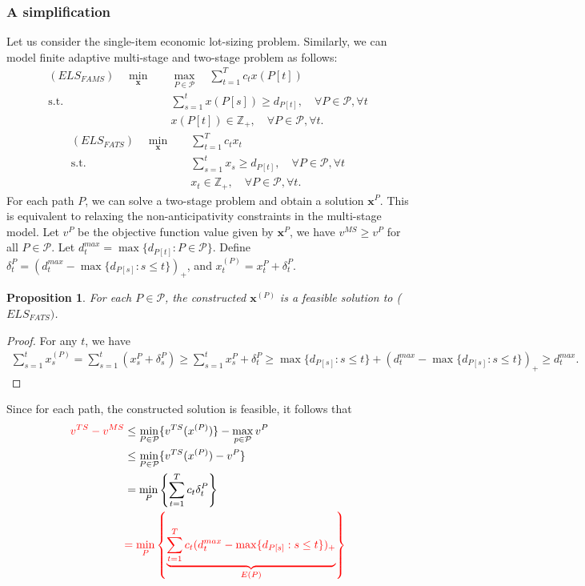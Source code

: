 \documentclass[10pt]{article}
\theoremstyle{plain}
\newtheorem{proposition}{Proposition}
\theoremstyle{definition}
\theoremstyle{remark}
\newcommand{\subjectto}{\text{s.t.}}
\newcommand{\bx}{\mathbf{x}}
\newcommand{\cP}{\mathcal{P}}
\newcommand{\Z}{\mathbb{Z}}
\begin{document}
\subsubsection*{A simplification}\label{simplification}
Let us consider the single-item economic lot-sizing problem.
Similarly, we can model finite adaptive multi-stage and two-stage problem as follows:
\begin{align}
(ELS_{FAMS}) \quad \min_{\bx} \quad
& \max_{P \in \cP} \quad  \sum_{t=1}^{T}c_t x(P[t])\\
\subjectto\quad 
& \sum_{s=1}^t x(P[s]) \ge d_{P[t]}, \quad \forall P\in \cP, \forall t \label{ELS:demand}\\
& x(P[t])\in \Z_+, \quad \forall P\in \cP, \forall t.
\end{align}
\begin{align*}
(ELS_{FATS}) \quad \min_{\bx} \quad 
&\sum_{t=1}^{T} c_t x_t\\
\subjectto\quad 
& \sum_{s=1}^t x_s \ge d_{P[t]}, \quad \forall P\in \cP, \forall t\\
& x_t\in \Z_+, \quad \forall P\in \cP, \forall t.
\end{align*}
For each path $P$, we can solve a two-stage problem and obtain a solution $\bx^P$.
This is equivalent to relaxing the non-anticipativity constraints in the multi-stage model.
Let $v^P$ be the objective function value given by $\bx^P$, we have $v^{MS} \ge v^P$
for all $P\in \cP$.
Let $d_t^{max} = \max\{d_{P[t]}: P\in \cP\}$.
Define $\delta_t^P = (d_t^{max} - \max\{d_{P[s]}: s\le t\})_+$,
and $x^{(P)}_t = x^P_t + \delta_t^P$.
\begin{proposition}
	For each $P\in \cP$, the constructed $\bx^{(P)}$ is a feasible solution to ($ELS_{FATS})$.
\end{proposition}
\begin{proof}
	For any $t$, we have
	\begin{align*}
	\sum_{s=1}^t x^{(P)}_s = \sum_{s=1}^{t}(x_s^P + \delta_s^P)
	\ge \sum_{s=1}^{t}x_s^P + \delta_t^P
	\ge \max\{d_{P[s]}: s\le t\} + (d_t^{max} - \max\{d_{P[s]}: s\le t\})_+
	\ge d_t^{max}.
	\end{align*}
\end{proof}
Since for each path, the constructed solution is feasible, it follows that
\begin{align*}
{\color{red} v^{TS} - v^{MS}} & \le \min_{P\in \cP} \{v^{TS}(x^{(P)})\} - \max_{p\in\cP} v^P\\
& \le \min_{P\in \cP} \{v^{TS}(x^{(P)}) - v^P\}\\
& = \min_{P}\left\{\sum_{t=1}^{T}c_t\delta_t^P\right\}\\
& {\color{red} = \min_{P}\left\{\underbrace{\sum_{t=1}^{T}c_t(d_t^{max} - \max\{d_{P[s]}: s\le t\})_+}_{E(P)}\right\}}\\
\end{align*}
\end{document}
